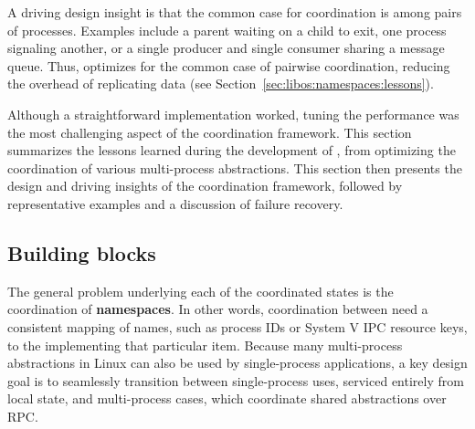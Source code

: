 A driving design insight is that the common case
for coordination is among pairs of processes.
Examples include a parent waiting on a child to exit, 
one process signaling another, or a single producer and single consumer
sharing a message queue.
Thus, \graphene{} optimizes for the common case of pairwise coordination,
reducing the overhead of replicating data (see Section~\ref{sec:libos:namespaces:lessons}).



Although a straightforward implementation worked, tuning the performance was the most challenging aspect of the coordination framework. 
This section summarizes the lessons learned during the development of \graphene{}, from optimizing the coordination of various multi-process abstractions.
This section then
presents the design and driving insights of the coordination framework,
followed by representative examples 
and a discussion of failure recovery.

\subsection{Building blocks}
\label{sec:libos:namespaces:building-blocks}

The general problem underlying each of the coordinated \libos{} states is 
the coordination of {\bf namespaces}.  In other words, coordination between \picoprocs{} need 
a consistent mapping of names, such as process IDs or System V IPC resource keys, 
to the \picoproc{} implementing that particular item.  
Because many multi-process abstractions in Linux can also be used by single-process applications,
a key design goal is to seamlessly transition between single-process uses, serviced 
entirely from local \libos{} state, and multi-process cases, which coordinate shared abstractions over RPC.


